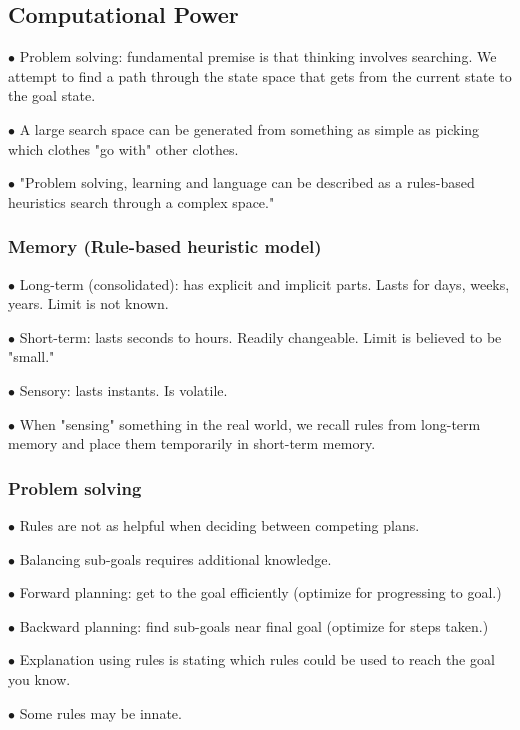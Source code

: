 \documentclass[english,openany]{book}
\begin{document}
\subsection{Computational Power}

$\bullet$ Problem solving: fundamental premise is that thinking involves searching. We attempt to find a path through the state space that gets from the current state to the goal state.

$\bullet$ A large search space can be generated from something as simple as picking which clothes "go with" other clothes.

$\bullet$ "Problem solving, learning and language can be described as a rules-based heuristics search through a complex space."

\subsubsection{Memory (Rule-based heuristic model)}

$\bullet$ Long-term (consolidated): has explicit and implicit parts. Lasts for days, weeks, years. Limit is not known.

$\bullet$ Short-term: lasts seconds to hours. Readily changeable. Limit is believed to be "small."

$\bullet$ Sensory: lasts instants. Is volatile.

$\bullet$ When "sensing" something in the real world, we recall rules from long-term memory and place them temporarily in short-term memory.


\subsubsection{Problem solving}

$\bullet$ Rules are not as helpful when deciding between competing plans.

$\bullet$ Balancing sub-goals requires additional knowledge.

$\bullet$ Forward planning: get to the goal efficiently (optimize for progressing to goal.)

$\bullet$ Backward planning: find sub-goals near final goal (optimize for steps taken.)

$\bullet$ Explanation using rules is stating which rules could be used to reach the goal you know.

$\bullet$ Some rules may be innate.
\end{document}
